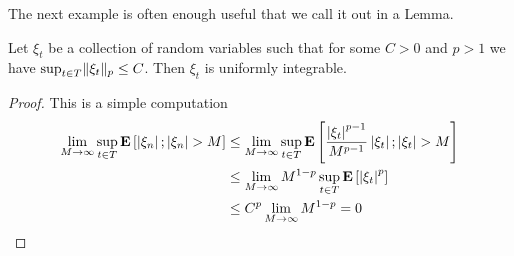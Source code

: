 The next example is often enough useful that we call it out in a Lemma.
\begin{lem}\label{BoundedLpImpliesUniformlyIntegrable}Let $\xi_t$ be a collection of random variables such that
  for some $C > 0$ and $p > 1$ we have
  $\sup_{t \in T} \lVert \xi_t \rVert_p \leq C$.  Then $\xi_t$ is uniformly
  integrable.
\end{lem}
\begin{proof} 
This is a simple computation
\begin{align*}
\lim_{M \to \infty} \sup_{t \in T} \textbf{E}\left[\left \vert \xi_n \right \vert ;
  \left \vert \xi_n \right \vert > M\right] &\leq
\lim_{M \to \infty} \sup_{t \in T} \textbf{E}\left[\frac{\left \vert \xi_t \right \vert^{p-1}}{M^{p-1}}\left \vert \xi_t \right \vert ;
  \left \vert \xi_t \right \vert > M\right] \\
&\leq \lim_{M \to \infty} M^{1-p} \sup_{t \in T}
\textbf{E}\left[\left \vert \xi_t \right \vert^p\right] \\
&\leq C^p \lim_{M \to \infty} M^{1-p} = 0
\end{align*}
\end{proof}

